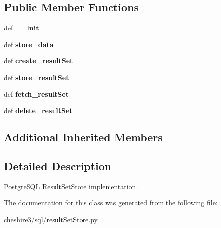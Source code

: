 \subsection*{Public Member Functions}
\begin{DoxyCompactItemize}
\item 
\hypertarget{classcheshire3_1_1sql_1_1result_set_store_1_1_postgres_result_set_store_a7ef38c8bd772524b14a3670b45a09931}{def {\bfseries \-\_\-\-\_\-init\-\_\-\-\_\-}}\label{classcheshire3_1_1sql_1_1result_set_store_1_1_postgres_result_set_store_a7ef38c8bd772524b14a3670b45a09931}

\item 
\hypertarget{classcheshire3_1_1sql_1_1result_set_store_1_1_postgres_result_set_store_aed21ed9cc7f1d849dc6d8fb1b94fd810}{def {\bfseries store\-\_\-data}}\label{classcheshire3_1_1sql_1_1result_set_store_1_1_postgres_result_set_store_aed21ed9cc7f1d849dc6d8fb1b94fd810}

\item 
\hypertarget{classcheshire3_1_1sql_1_1result_set_store_1_1_postgres_result_set_store_a81cc11388fb8e275421d4a3f76df1884}{def {\bfseries create\-\_\-result\-Set}}\label{classcheshire3_1_1sql_1_1result_set_store_1_1_postgres_result_set_store_a81cc11388fb8e275421d4a3f76df1884}

\item 
\hypertarget{classcheshire3_1_1sql_1_1result_set_store_1_1_postgres_result_set_store_a2c86345a4d5102fc984f218f7c4ce881}{def {\bfseries store\-\_\-result\-Set}}\label{classcheshire3_1_1sql_1_1result_set_store_1_1_postgres_result_set_store_a2c86345a4d5102fc984f218f7c4ce881}

\item 
\hypertarget{classcheshire3_1_1sql_1_1result_set_store_1_1_postgres_result_set_store_ac1e29c22ff7237231eef2b02df9eb9b2}{def {\bfseries fetch\-\_\-result\-Set}}\label{classcheshire3_1_1sql_1_1result_set_store_1_1_postgres_result_set_store_ac1e29c22ff7237231eef2b02df9eb9b2}

\item 
\hypertarget{classcheshire3_1_1sql_1_1result_set_store_1_1_postgres_result_set_store_af1afc09e1082a7c0dd6169c835647353}{def {\bfseries delete\-\_\-result\-Set}}\label{classcheshire3_1_1sql_1_1result_set_store_1_1_postgres_result_set_store_af1afc09e1082a7c0dd6169c835647353}

\end{DoxyCompactItemize}
\subsection*{Additional Inherited Members}


\subsection{Detailed Description}
\begin{DoxyVerb}PostgreSQL ResultSetStore implementation.\end{DoxyVerb}
 

The documentation for this class was generated from the following file\-:\begin{DoxyCompactItemize}
\item 
cheshire3/sql/result\-Set\-Store.\-py\end{DoxyCompactItemize}
